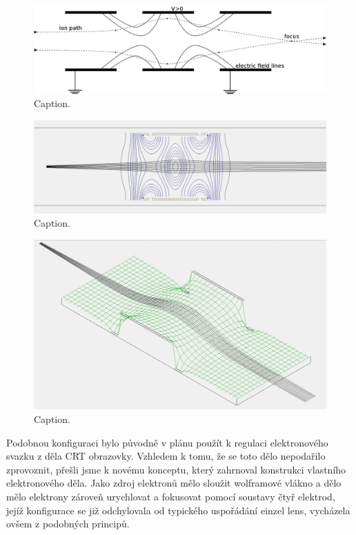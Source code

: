 \begin{figure}[htbp!]
\centering
\includegraphics[width = 366 pt]{Figure/05/schema.png}
\caption{Caption.}
\label{05schemaEinzelLens}
\end{figure}

\begin{figure}[htbp!]
\centering
\includegraphics[width = 366 pt]{Figure/05/3a.jpg}
\caption{Caption.}
\label{05simulaceEinzelLens}
\end{figure}

\begin{figure}[htbp!]
\centering
\includegraphics[width = 366 pt]{Figure/05/3b.jpg}
\caption{Caption.}
\label{05simulaceEinzelLensPotencial}
\end{figure}

Podobnou konfiguraci bylo původně v plánu použít k regulaci elektronového svazku z děla CRT obrazovky. Vzhledem k tomu, že se toto dělo nepodařilo zprovoznit, přešli jsme k novému konceptu, který zahrnoval konstrukci vlastního elektronového děla. Jako zdroj elektronů mělo sloužit wolframové vlákno a dělo mělo elektrony zároveň urychlovat a fokusovat pomocí soustavy čtyř elektrod, jejíž konfigurace se již odchylovala od typického uspořádání einzel lens, vycházela ovšem z podobných principů.\\

